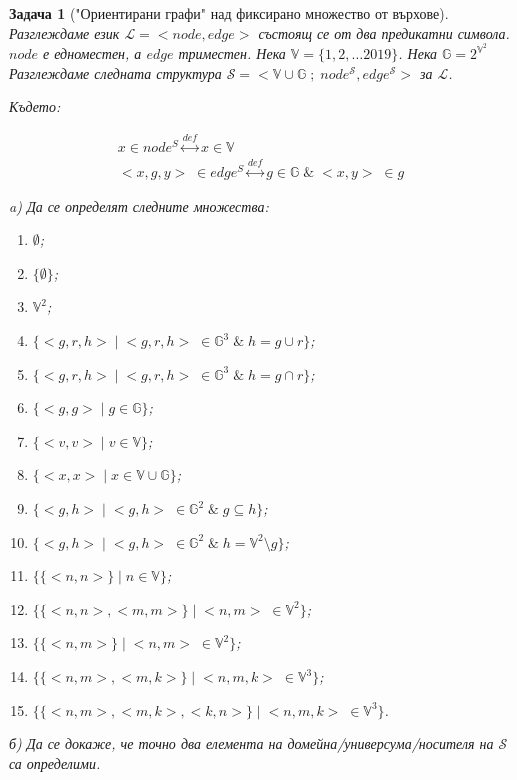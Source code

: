 \documentclass[12pt]{article}
\newtheorem{problem}{Задача}%
\begin{document}
\begin{problem}["Ориентирани графи" \; над фиксирано множество от върхове]

Разглеждаме език \(\mathcal{L} = <node, edge>\) състоящ се от два предикатни символа.
\(node\) е едноместен, а \(edge\) триместен. 
Нека \(\mathbb{V} = \{1, 2, \dots 2019\}\).
Нека \(\mathbb{G} = 2^{\mathbb{V}^2}\)
Разглеждаме следната структура \(\mathcal{S} = <\mathbb{V} \cup \mathbb{G} \; ; \; node^\mathcal{S}, edge^\mathcal{S}>\) за \(\mathcal{L}\).

Където:

\begin{eqnarray*}
x \in node^S \overset{def}{\longleftrightarrow} x \in \mathbb{V} \\
<x, g, y> \; \in edge^S \overset{def}{\longleftrightarrow} g \in \mathbb{G} \; \& \; <x, y> \; \in g
\end{eqnarray*}

a) Да се определят следните множества:

\begin{enumerate}
\item \(\emptyset\);
\item \(\{\emptyset\}\);
\item \(\mathbb{V}^2\);
\item \(\{<g, r, h> \; | \; <g, r, h> \; \in \mathbb{G}^3 \; \& \; h = g \cup r \}\);
\item \(\{<g, r, h> \; | \; <g, r, h> \; \in \mathbb{G}^3 \; \& \; h = g \cap r \}\);
\item \(\{ <g, g> \; | \; g \in \mathbb{G} \}\);
\item \(\{ <v, v> \; | \; v \in \mathbb{V} \}\);
\item \(\{ <x, x> \; | \; x \in \mathbb{V} \cup \mathbb{G} \}\);
\item \(\{<g, h> \; | \; <g, h> \; \in \mathbb{G}^2 \; \& \; g \subseteq h \}\);
\item \(\{<g, h> \; | \; <g, h> \; \in \mathbb{G}^2 \; \& \; h = \mathbb{V}^2 \setminus g \}\);
\item \(\{ \{<n, n>\} \; | \; n \in \mathbb{V} \}\);
\item \(\{ \{<n, n>, <m, m>\} \; | \; <n, m> \; \in \mathbb{V}^2 \}\);
\item \(\{ \{<n, m>\} \; | \; <n, m> \; \in \mathbb{V}^2 \}\);
\item \(\{ \{<n, m>, <m, k>\} \; | \; <n, m, k> \; \in \mathbb{V}^3 \}\);
\item \(\{ \{<n, m>, <m, k>, <k, n>\} \; | \; <n, m, k> \; \in \mathbb{V}^3 \}\).
\end{enumerate}

б) Да се докаже, че точно два елемента на домейна/универсума/носителя на \(\mathcal{S}\) са определими.
\end{problem}
\end{document}
